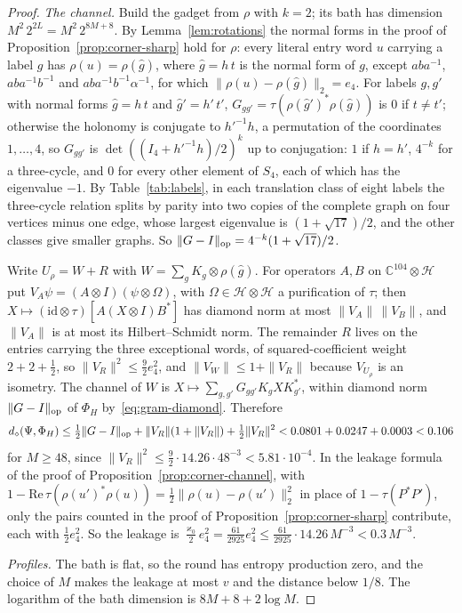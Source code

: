 \documentclass[11pt,a4paper]{article}
\theoremstyle{plain}
\theoremstyle{definition}
\theoremstyle{remark}
\newcommand{\ddia}{d_\diamond}
\begin{document}
\begin{proof}
\emph{The channel.} Build the gadget from $\rho$ with $k=2$; its bath has dimension $M^2\,2^{2L}=M^2\,2^{8M+8}$. By
Lemma~\ref{lem:rotations} the normal forms in the proof of Proposition~\ref{prop:corner-sharp} hold for $\rho$: every literal entry word
$u$ carrying a label $g$ has $\rho(u)=\rho(\hat g)$, where $\hat g=h\,t$ is the normal form of $g$, except $aba^{-1}$, $aba^{-1}b^{-1}$ and
$aba^{-1}b^{-1}\alpha^{-1}$, for which $\|\rho(u)-\rho(\hat g)\|_2=e_4$. For labels $g,g'$ with normal forms $\hat g=h\,t$ and $\hat g'=h'\,t'$,
$G_{gg'}=\tau(\rho(\hat g')^*\rho(\hat g))$ is $0$ if $t\ne t'$; otherwise the holonomy is conjugate to $h'^{-1}h$, a permutation of the
coordinates $1,\dots,4$, so $G_{gg'}$ is $\det((I_4+h'^{-1}h)/2)^k$ up to conjugation: $1$ if $h=h'$, $4^{-k}$ for a three-cycle, and $0$
for every other element of $S_4$, each of which has the eigenvalue $-1$. By Table~\ref{tab:labels}, in each translation class of eight labels
the three-cycle relation splits by parity into two copies of the complete graph on four vertices minus one edge, whose largest eigenvalue is
$(1+\sqrt{17})/2$, and the other classes give smaller graphs. So $\|G-I\|_{\rm op}=4^{-k}(1+\sqrt{17})/2$.

Write $U_\rho=W+R$ with $W=\sum_gK_g\otimes\rho(\hat g)$. For operators $A,B$ on $\mathbb C^{104}\otimes\mathcal H$ put
$V_A\psi=(A\otimes I)(\psi\otimes\Omega)$, with $\Omega\in\mathcal H\otimes\mathcal H$ a purification of $\tau$; then
$X\mapsto(\mathrm{id}\otimes\tau)[A(X\otimes I)B^*]$ has diamond norm at most $\|V_A\|\,\|V_B\|$, and $\|V_A\|$ is at most its
Hilbert--Schmidt norm. The remainder $R$ lives on the entries carrying the three exceptional words, of squared-coefficient weight
$2+2+\frac12$, so $\|V_R\|^2\le\frac92e_4^2$, and $\|V_W\|\le1+\|V_R\|$ because $V_{U_\rho}$ is an isometry. The channel of $W$ is
$X\mapsto\sum_{g,g'}G_{gg'}K_gXK_{g'}^*$, within diamond norm $\|G-I\|_{\rm op}$ of $\Phi_H$ by~\eqref{eq:gram-diamond}. Therefore
\[
\ddia(\Psi,\Phi_H)\le\tfrac12\|G-I\|_{\rm op}+\|V_R\|(1+\|V_R\|)+\tfrac12\|V_R\|^2<0.0801+0.0247+0.0003<0.106
\]
for $M\ge48$, since $\|V_R\|^2\le\frac92\cdot14.26\cdot48^{-3}<5.81\cdot10^{-4}$. In the leakage formula of the proof of
Proposition~\ref{prop:corner-channel}, with $1-\mathrm{Re}\,\tau(\rho(u')^*\rho(u))=\frac12\|\rho(u)-\rho(u')\|_2^2$ in place of
$1-\tau(P^*P')$, only the pairs counted in the proof of Proposition~\ref{prop:corner-sharp} contribute, each with $\frac12e_4^2$. So the
leakage is $\frac{\varkappa_0}2e_4^2=\frac{61}{2925}e_4^2\le\frac{61}{2925}\cdot14.26\,M^{-3}<0.3\,M^{-3}$.

\emph{Profiles.} The bath is flat, so the round has entropy production zero, and the choice of $M$ makes the leakage at most $v$ and the
distance below $1/8$. The logarithm of the bath dimension is $8M+8+2\log M$.
\end{proof}
\end{document}
